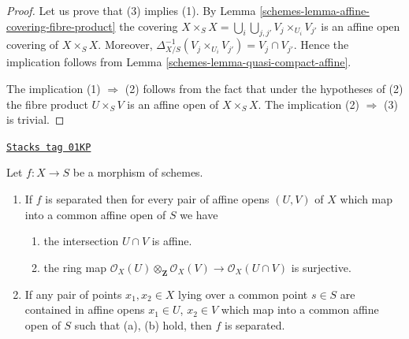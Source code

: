 \begin{proof}

Let us prove that (3) implies (1).
By Lemma \ref{schemes-lemma-affine-covering-fibre-product}
the covering $X \times_S X = \bigcup_i \bigcup_{j, j'} V_j \times_{U_i} V_{j'}$
is an affine open covering of $X \times_S X$.
Moreover, $\Delta_{X/S}^{-1}(V_j \times_{U_i} V_{j'}) = V_j \cap V_{j'}$.
Hence the implication follows from Lemma \ref{schemes-lemma-quasi-compact-affine}.

\medskip\noindent
The implication (1) $\Rightarrow$ (2) follows from the fact
that under the hypotheses of (2) the fibre product
$U \times_S V$ is an affine open of $X \times_S X$.
The implication (2) $\Rightarrow$ (3) is trivial.
\end{proof}

\begin{lemma}
\label{schemes-lemma-characterize-separated}
\href{https://stacks.math.columbia.edu/tag/01KP}{\texttt{Stacks tag 01KP}}

Let $f : X \to S$ be a morphism of schemes.
\begin{enumerate}
\item If $f$ is separated then for every pair of affine
opens $(U, V)$ of $X$ which map into a
common affine open of $S$ we have
\begin{enumerate}
\item the intersection $U \cap V$ is affine.
\item the ring map
$\mathcal{O}_X(U) \otimes_{\mathbf{Z}} \mathcal{O}_X(V)
\to \mathcal{O}_X(U \cap V)$
is surjective.
\end{enumerate}
\item If any pair of points $x_1, x_2 \in X$ lying over a common
point $s \in S$ are contained in affine opens $x_1 \in U$,
$x_2 \in V$ which map into a common affine open of $S$ such
that (a), (b) hold, then $f$ is separated.
\end{enumerate}
\end{lemma}

